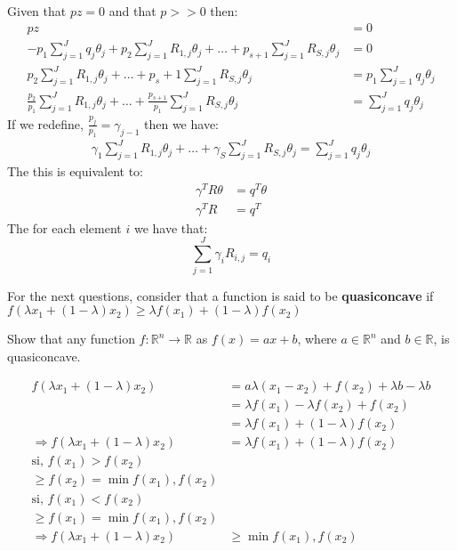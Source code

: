 \documentclass[answers]{exam}
\theoremstyle{definition}
\begin{document}
\begin{questions}
\begin{parts}
        \begin{solution}
            Given that $pz=0$ and that $p>>0$ then:
            \begin{align*}
                pz&=0\\
                -p_1\sum_{j=1}^{J}q_j\theta_j+p_2\sum_{j=1}^{J}R_{1,j}\theta_j+\ldots+p_{s+1}\sum_{j=1}^{J}R_{S,j}\theta_j&=0\\
                p_2\sum_{j=1}^{J}R_{1,j}\theta_j+\ldots+p_s+1\sum_{j=1}^{J}R_{S,j}\theta_j&=p_1\sum_{j=1}^{J}q_j\theta_j\\
                \frac{p_2}{p_1}\sum_{j=1}^{J}R_{1,j}\theta_j+\ldots+\frac{p_{s+1}}{p_1}\sum_{j=1}^{J}R_{S,j}\theta_j&=\sum_{j=1}^{J}q_j\theta_j
            \end{align*}
            If we redefine, $\frac{p_{j}}{p_1}=\gamma_{j-1}$ then we have:
            \begin{align*}
                \gamma_1\sum_{j=1}^{J}R_{1,j}\theta_j+\ldots+\gamma_S\sum_{j=1}^{J}R_{S,j}\theta_j=\sum_{j=1}^{J}q_j\theta_j
            \end{align*}
            The this is equivalent to:
            \begin{align*}
                \gamma^T R \theta&=q^T\theta\\
                \gamma^T R&=q^T
            \end{align*}
            The for each element $i$ we have that:
            $$\sum_{j=1}^J \gamma_i R_{i,j}=q_i$$
        \end{solution}
    
\end{parts}

    \vspace{1cm}

    For the next questions, consider that a function is said to be \textbf{quasiconcave} if $f(\lambda x_1+(1-\lambda)x_2)\geq \lambda f(x_1)+(1-\lambda)f(x_2)$

    \question Show that any function $f:\mathds{R}^n\rightarrow\mathds{R}$ as $f(x)=ax+b$, where $a\in\mathds{R}^n$ and $b\in\mathds{R}$, is quasiconcave.
        \begin{solution}
        \begin{align*}
            f(\lambda x_1+(1-\lambda)x_2)&=a\lambda(x_1-x_2)+f(x_2)+\lambda b-\lambda b\\
            &=\lambda f(x_1)-\lambda f(x_2)+f(x_2)\\
            &=\lambda f(x_1)+(1-\lambda)f(x_2)\\
            \Rightarrow f(\lambda x_1+(1-\lambda)x_2)&=\lambda f(x_1)+(1-\lambda)f(x_2)\\
            \text{si, } f(x_1)>f(x_2)\\
            \geq f(x_2)=\min{f(x_1),f(x_2)}\\
            \text{si, } f(x_1)<f(x_2)\\
            \geq f(x_1)=\min{f(x_1),f(x_2)}\\
            \Rightarrow f(\lambda x_1+(1-\lambda)x_2)&\geq\min{f(x_1),f(x_2)}
        \end{align*}
    \end{solution}


\end{questions}
\end{document}
